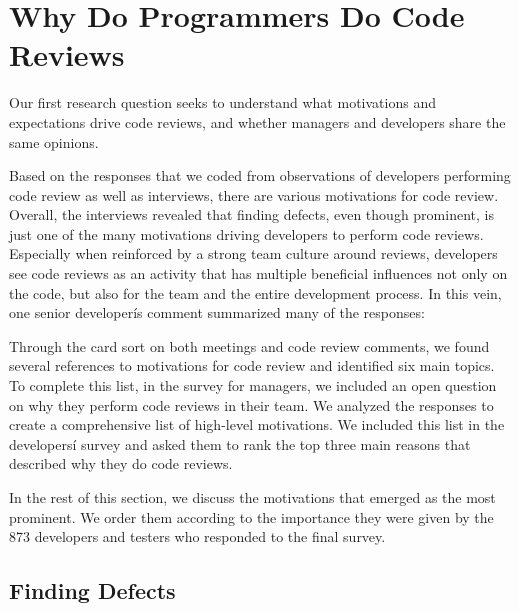 
\section{Why Do Programmers Do Code Reviews} \label{sec:expectations}


Our first research question seeks to understand what motivations and
expectations drive code reviews, and whether managers and developers share the
same opinions.

Based on the responses that we coded from observations of developers performing
code review as well as interviews, there are various motivations for code
review. Overall, the interviews revealed that finding defects, even though
prominent, is just one of the many motivations driving developers to perform
code reviews. Especially when reinforced by a strong team culture around
reviews, developers see code reviews as an activity that has multiple
beneficial influences not only on the code, but also for the team and the
entire development process. In this vein, one senior developerís comment
summarized many of the responses: 

Through the card sort on both meetings and code review comments, we found
several references to motivations for code review and identified six main
topics. To complete this list, in the survey for managers, we included an open
question on why they perform code reviews in their team. We analyzed the
responses to create a comprehensive list of high-level motivations. We included
this list in the developersí survey and asked them to rank the top three main
reasons that described why they do code reviews.

In the rest of this section, we discuss the motivations that emerged as the
most prominent. We order them according to the importance they were given by
the 873 developers and testers who responded to the final survey.

\subsection{Finding Defects}

